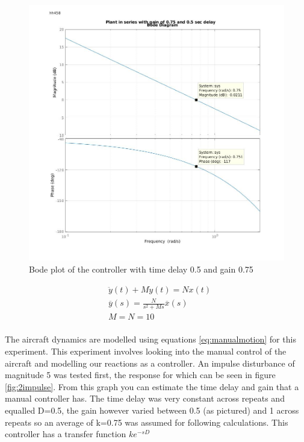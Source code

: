 \documentclass[twoside,twocolumn]{article}
\begin{document}
\begin{figure}[h]
  \centering
    \includegraphics[width=\linewidth]{2_zoomed_in_bode}
  \caption{Bode plot of the controller with time delay 0.5 and gain 0.75 }
  \label{fig:2bode}
\end{figure}

\begin{equation}
\label{eq:manualmotion}
\begin{split}
&\ddot{y}(t) + M\dot{y}(t)=Nx(t)\\
& \overline{y}(s)=\frac{N}{s^2+Ms}\overline{x}(s)\\
&M=N=10\\
\end{split}
\end{equation}





The aircraft dynamics are modelled using equations \ref{eq:manualmotion} for this experiment. This experiment involves looking into the manual control of the aircraft and modelling our reactions as a controller. An impulse disturbance of magnitude 5 was tested first, the response for which can be seen in figure \ref{fig:2impulse}. From this graph you can estimate the time delay and gain that a manual controller has. The time delay was very constant across repeats and equalled D=0.5, the gain however varied between 0.5 (as pictured) and 1 across repeats so an average of k=0.75 was assumed for following calculations. This controller has a transfer function $ke^{-sD}$
\newline
\end{document}
